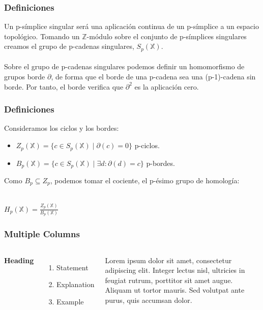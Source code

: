 \documentclass{beamer}
\begin{document}

\begin{frame}
  \frametitle{Definiciones}

  Un p-símplice singular será una aplicación continua de un p-símplice a un espacio topológico.
  Tomando un $\mathbb{Z}$-módulo sobre el conjunto de p-símplices singulares creamos el grupo
  de p-cadenas singulares, $S_p(\mathbb{X})$.
  \\~\\
  Sobre el grupo de p-cadenas singulares podemos definir un homomorfismo de grupos borde $\partial$,
  de forma que el borde de una p-cadena sea una (p-1)-cadena sin borde. Por tanto, el borde verifica
  que $\partial^2$ es la aplicación cero.

\end{frame}


\begin{frame}
  \frametitle{Definiciones}
  Consideramos los ciclos y los bordes:
  \begin{itemize}
    \item $Z_p(\mathbb{X}) = \{c \in S_p(\mathbb{X}) \mid \partial(c) = 0\}$ p-ciclos.
    \item $B_p(\mathbb{X}) = \{c \in S_p(\mathbb{X}) \mid \exists d \colon \partial(d) = c\}$ p-bordes.
  \end{itemize}

  Como $B_p \subseteq Z_p$, podemos tomar el cociente, el p-ésimo grupo de homología: \\~\\
  \centerline{$H_p(\mathbb{X}) = \frac{Z_p(\mathbb{X})}{B_p(\mathbb{X})}$}
\end{frame}


\begin{frame}
\frametitle{Multiple Columns}
\begin{columns}[c] %

\textbf{Heading}
\begin{enumerate}
\item Statement
\item Explanation
\item Example
\end{enumerate}

Lorem ipsum dolor sit amet, consectetur adipiscing elit. Integer lectus nisl, ultricies in feugiat rutrum, porttitor sit amet augue. Aliquam ut tortor mauris. Sed volutpat ante purus, quis accumsan dolor.

\end{columns}
\end{frame}
\end{document}
